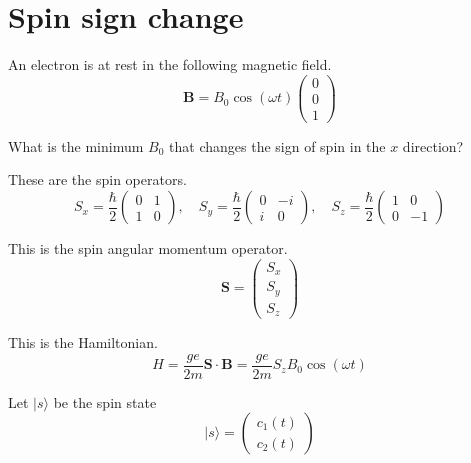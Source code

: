 

\section*{Spin sign change}

An electron is at rest in the following magnetic field.
\begin{equation*}
\mathbf B=B_0\cos(\omega t)\begin{pmatrix}0\\0\\1\end{pmatrix}
\end{equation*}

What is the minimum $B_0$ that changes the sign of spin in the $x$ direction?

\bigskip
These are the spin operators.
\begin{equation*}
S_x=\frac{\hbar}{2}\begin{pmatrix}0&1\\1&0\end{pmatrix},\quad
S_y=\frac{\hbar}{2}\begin{pmatrix}0&-i\\i&0\end{pmatrix},\quad
S_z=\frac{\hbar}{2}\begin{pmatrix}1&0\\0&-1\end{pmatrix}
\end{equation*}

This is the spin angular momentum operator.
\begin{equation*}
\mathbf S=\begin{pmatrix}S_x\\S_y\\S_z\end{pmatrix}
\end{equation*}

This is the Hamiltonian.
\begin{equation*}
H=\frac{ge}{2m}\mathbf S\cdot\mathbf B
=\frac{ge}{2m}S_zB_0\cos(\omega t)
\end{equation*}

Let $|s\rangle$ be the spin state
\begin{equation*}
|s\rangle=\begin{pmatrix}c_1(t)\\c_2(t)\end{pmatrix}
\end{equation*}

